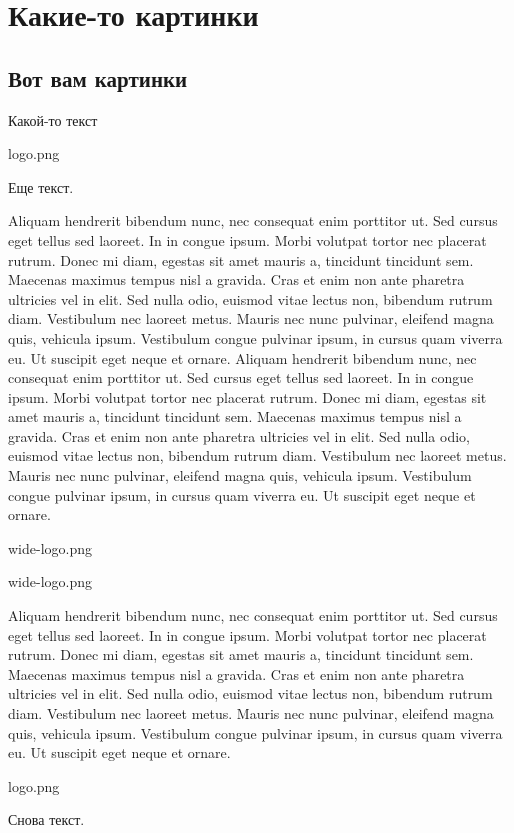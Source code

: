 \chapter{Какие-то картинки}
\section{Вот вам картинки}

Какой-то текст

    {logo.png}

Еще текст.

Aliquam hendrerit bibendum nunc, nec consequat enim porttitor ut. Sed cursus eget tellus sed laoreet. In in congue ipsum. Morbi volutpat tortor nec placerat rutrum. Donec mi diam, egestas sit amet mauris a, tincidunt tincidunt sem. Maecenas maximus tempus nisl a gravida. Cras et enim non ante pharetra ultricies vel in elit. Sed nulla odio, euismod vitae lectus non, bibendum rutrum diam. Vestibulum nec laoreet metus. Mauris nec nunc pulvinar, eleifend magna quis, vehicula ipsum. Vestibulum congue pulvinar ipsum, in cursus quam viverra eu. Ut suscipit eget neque et ornare. Aliquam hendrerit bibendum nunc, nec consequat enim porttitor ut. Sed cursus eget tellus sed laoreet. In in congue ipsum. Morbi volutpat tortor nec placerat rutrum. Donec mi diam, egestas sit amet mauris a, tincidunt tincidunt sem. Maecenas maximus tempus nisl a gravida. Cras et enim non ante pharetra ultricies vel in elit. Sed nulla odio, euismod vitae lectus non, bibendum rutrum diam. Vestibulum nec laoreet metus. Mauris nec nunc pulvinar, eleifend magna quis, vehicula ipsum. Vestibulum congue pulvinar ipsum, in cursus quam viverra eu. Ut suscipit eget neque et ornare.

	{wide-logo.png}

	{wide-logo.png}

Aliquam hendrerit bibendum nunc, nec consequat enim porttitor ut. Sed cursus eget tellus sed laoreet. In in congue ipsum. Morbi volutpat tortor nec placerat rutrum. Donec mi diam, egestas sit amet mauris a, tincidunt tincidunt sem. Maecenas maximus tempus nisl a gravida. Cras et enim non ante pharetra ultricies vel in elit. Sed nulla odio, euismod vitae lectus non, bibendum rutrum diam. Vestibulum nec laoreet metus. Mauris nec nunc pulvinar, eleifend magna quis, vehicula ipsum. Vestibulum congue pulvinar ipsum, in cursus quam viverra eu. Ut suscipit eget neque et ornare.

    {logo.png}

Снова текст.
